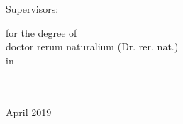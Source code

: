 \documentclass[
11pt, %
english, %
singlespacing, %
headsepline, %
onecolumn
]{MastersDoctoralThesis} %
\begin{document}
\begin{titlepage}
\begin{center}
\vspace*{2cm}

Supervisors:\\
\supname
 
\vspace{3cm}


\large for the degree of\\
doctor rerum naturalium (Dr. rer. nat.)\\ %
in \groupname\\\deptname\\\facname\\ %
 
\bigskip

{\large April 2019}\\[4cm] %

\end{center}
\end{titlepage}

\end{document}
